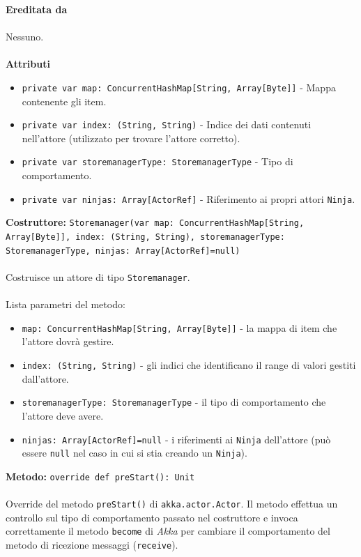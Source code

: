 \documentclass[a4paper]{article}
\begin{document}
		\textbf{Ereditata da}
			\\ \\
			Nessuno.
			\\ \\
		\textbf{Attributi}
			\begin{itemize}
				\item \texttt{private var map: ConcurrentHashMap[String,  Array[Byte]]} - Mappa contenente gli item. 
				\item \texttt{private var index: (String, String)} - Indice dei dati contenuti nell'attore (utilizzato per trovare l'attore corretto).
				\item \texttt{private var storemanagerType: StoremanagerType} - Tipo di comportamento.
				\item \texttt{private var ninjas: Array[ActorRef]} - Riferimento ai propri attori \texttt{Ninja}.
			\end{itemize}
		\textbf{Costruttore: }\texttt{Storemanager(var map: ConcurrentHashMap[String,  Array[Byte]], index: (String, String), storemanagerType: StoremanagerType, ninjas: Array[ActorRef]=null)}
			\\ \\
			Costruisce un attore di tipo \texttt{Storemanager}.
			\\ \\
			Lista parametri del metodo:
			\begin{itemize}
				\item \texttt{map: ConcurrentHashMap[String,  Array[Byte]]} - la mappa di item che l'attore dovrà gestire.
				\item \texttt{index: (String, String)} - gli indici che identificano il range di valori gestiti dall'attore.
				\item \texttt{storemanagerType: StoremanagerType} - il tipo di comportamento che l'attore deve avere.
				\item \texttt{ninjas: Array[ActorRef]=null} - i riferimenti ai \texttt{Ninja} dell'attore (può essere \texttt{null} nel caso in cui si stia creando un \texttt{Ninja}).
			\end{itemize}
		\textbf{Metodo: }\texttt{override def preStart(): Unit}
			\\ \\
			Override del metodo \texttt{preStart()} di \texttt{akka.actor.Actor}. Il metodo effettua un controllo sul tipo di comportamento passato nel costruttore e invoca correttamente il metodo \texttt{become} di \emph{Akka} per cambiare il comportamento del metodo di ricezione messaggi (\texttt{receive}).
\end{document}
